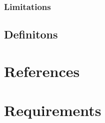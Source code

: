 \documentclass{scrreprt}
\begin{document}
\subsection{Limitations}


\section{Definitons}


\chapter{References}


\chapter{Requirements}
\end{document}
